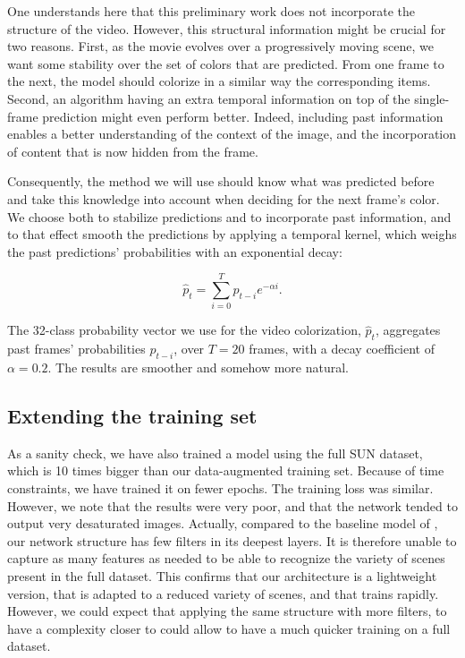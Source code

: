 \documentclass[10pt,twocolumn,letterpaper]{article}
\begin{document}
One understands here that this preliminary work does not incorporate the structure of the video. However, this structural information might be crucial for two reasons. First, as the movie evolves over a progressively moving scene, we want some stability over the set of colors that are predicted. From one frame to the next, the model should colorize in a similar way the corresponding items. Second, an algorithm having an extra temporal information on top of the single-frame prediction might even perform better. Indeed, including past information enables a better understanding of the context of the image, and the incorporation of content that is now hidden from the frame.

Consequently, the method we will use should know what was predicted before and take this knowledge into account when deciding for the next frame's color. We choose both to stabilize predictions and to incorporate past information, and to that effect smooth the predictions by applying a temporal kernel, which weighs the past predictions' probabilities with an exponential decay:

 $$\hat p_t = \sum_{i = 0}^T p_{t-i} e^{-\alpha i}.$$

The 32-class probability vector we use for the video colorization, $\hat p_t$, aggregates past frames' probabilities $p_{t-i}$, over $T=20$ frames, with a decay coefficient of $\alpha=0.2$. The results are smoother and somehow more natural.

\subsection{Extending the training set}

As a sanity check, we have also trained a model using the full SUN dataset, which is 10 times bigger than our data-augmented training set. Because of time constraints, we have trained it on fewer epochs. The training loss was similar. However, we note that the results were very poor, and that the network tended to output very desaturated images. Actually, compared to the baseline model of \cite{zhang2016colorful}, our network structure has few filters in its deepest layers. It is therefore unable to capture as many features as needed to be able to recognize the variety of scenes present in the full dataset. This confirms that our architecture is a lightweight version, that is adapted to a reduced variety of scenes, and that trains rapidly. However, we could expect that applying the same structure with more filters, to have a complexity closer to \cite{zhang2016colorful} could allow to have a much quicker training on a full dataset.
\end{document}
